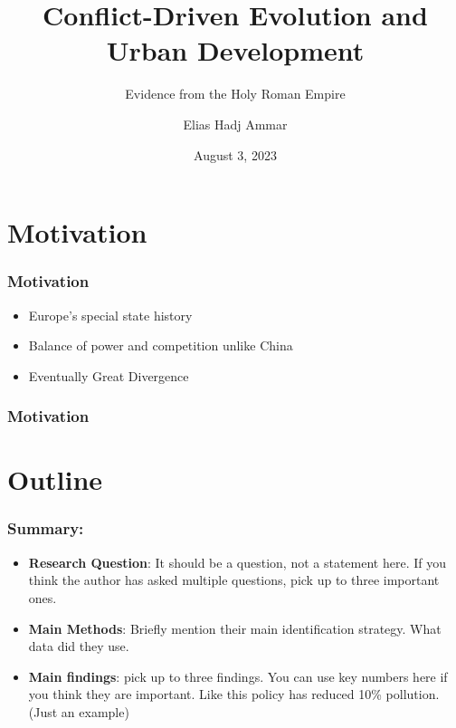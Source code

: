 \documentclass{beamer}
\title[Kolloquium]{Conflict-Driven Evolution and Urban Development} %
\subtitle{Evidence from the Holy Roman Empire}
\author{Elias Hadj Ammar} %
\institute[LMU] %
{
LMU Munich\\ %
\medskip
\textit{Elias.Ammar@campus.lmu.de} %
}
\date{August 3, 2023} %
\begin{document}
\begin{frame}
\titlepage %
\end{frame}






\section{Motivation} %

\begin{frame}
\frametitle{Motivation}

\begin{itemize}
    \item Europe's special state history
    \item Balance of power and competition unlike China
    \item Eventually Great Divergence
    
\end{itemize}

\end{frame}


\begin{frame}
\frametitle{Motivation}
    
\end{frame}


\section{Outline} %

\begin{frame}
\frametitle{Summary:}
\justifying
\begin{itemize}
\item \textbf{Research Question}: It should be a question, not a statement here. If you think the author has asked multiple questions, pick up to three important ones. 
\item \textbf{Main Methods}: Briefly mention their main identification strategy. What data did they use. 
\item \textbf{Main findings}: pick up to three findings. You can use key numbers here if you think they are important. Like this policy has reduced 10\% pollution.(Just an example)
\end{itemize}

\end{frame}
\end{document}
